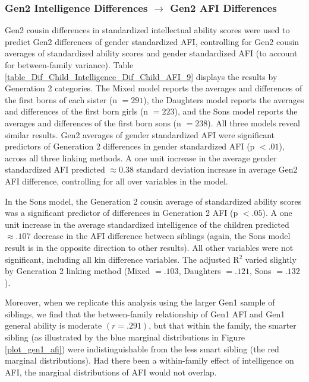 \subsubsection{Gen2 Intelligence Differences $\rightarrow$ Gen2 AFI Differences}
Gen2 cousin differences in standardized intellectual ability scores were used to predict Gen2 differences of gender standardized AFI, controlling for Gen2 cousin averages of standardized ability scores and gender standardized AFI (to account for between-family variance). Table \ref{table_Dif_Child_Intelligence_Dif_Child_AFI_9} displays the results by Generation 2 categories. The Mixed model reports the averages and differences of the first borns of each sister (n $= 291$), the Daughters model reports the averages and differences of the first born girls (n $= 223$), and the Sons model reports the averages and differences of the first born sons (n $= 238$). All three models reveal similar results. Gen2 averages of gender standardized AFI were significant predictors of Generation 2 differences in gender standardized AFI (p $< .01$), across all three linking methods. A one unit increase in the average gender standardized AFI predicted $\approx 0.38$ standard deviation increase in average Gen2 AFI difference, controlling for all over variables in the model. 

In the Sons model, the Generation 2 cousin average of standardized ability scores was a significant predictor of differences in Generation 2 AFI (p $< .05$). A one unit increase in the average standardized intelligence of the children predicted $\approx .107$ decrease in the AFI difference between siblings (again, the Sons model result is in the opposite direction to other results). All other variables were not significant, including all kin difference variables. The adjusted R$^{2}$ varied slightly by Generation 2 linking method (Mixed $= .103$, Daughters $= .121$, Sons $= .132$).

Moreover, when we replicate this analysis using the larger Gen1 sample of siblings, we find that the between-family relationship of Gen1 AFI and Gen1 general ability is moderate $(r =.291)$, but that within the family, the smarter sibling (as illustrated by the blue marginal distributions in Figure \ref{plot_gen1_afi}) were indistinguishable from the less smart sibling (the red marginal distributions). Had there been a within-family effect of intelligence on AFI, the marginal distributions of AFI would not overlap.\pagebreak

